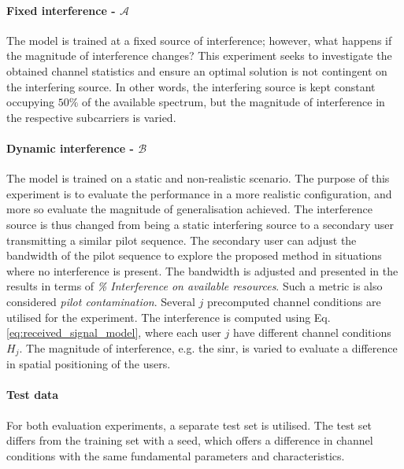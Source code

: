 \paragraph{Fixed interference - $\mathcal{A}$}
The model is trained at a fixed source of interference; however, what happens if the magnitude of interference changes? This experiment seeks to investigate the obtained channel statistics and ensure an optimal solution is not contingent on the interfering source. In other words, the interfering source is kept constant occupying $50\%$ of the available spectrum, but the magnitude of interference in the respective subcarriers is varied.

\paragraph{Dynamic interference - $\mathcal{B}$}
The model is trained on a static and non-realistic scenario. The purpose of this experiment is to evaluate the performance in a more realistic configuration, and more so evaluate the magnitude of generalisation achieved. The interference source is thus changed from being a static interfering source to a secondary user transmitting a similar pilot sequence. The secondary user can adjust the bandwidth of the pilot sequence to explore the proposed method in situations where no interference is present. The bandwidth is adjusted and presented in the results in terms of \emph{\% Interference on available resources}. Such a metric is also considered \emph{pilot contamination}. Several $j$ precomputed channel conditions are utilised for the experiment. The interference is computed using Eq. \ref{eq:received_signal_model}, where each user $j$ have different channel conditions $H_j$. The magnitude of interference, e.g. the \gls{sinr}, is varied to evaluate a difference in spatial positioning of the users.


\paragraph{Test data}
For both evaluation experiments, a separate test set is utilised. The test set differs from the training set with a seed, which offers a difference in channel conditions with the same fundamental parameters and characteristics.

